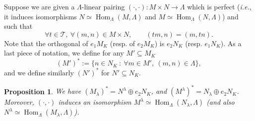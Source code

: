 \documentclass[12pt]{amsart}
\newcommand\cT{\mathcal{T}}
\DeclareMathOperator{\Hom}{Hom}
\theoremstyle{defstyle}
\theoremstyle{thmstyle}
\newtheorem{propAppendix}{Proposition}
\begin{document}
Suppose we are given a $\Lambda$-linear pairing $(\cdot,\cdot) \colon M\times N \to \Lambda$ which is perfect (\textit{i.e.}, it induces  isomorphisms $N \simeq \Hom_\Lambda(M,\Lambda)$ and $M \simeq \Hom_\Lambda(N,\Lambda)$) and such that 
\begin{equation}\label{eq:appendix_condition_T_equivariance_pairing}
	\forall t \in \cT,\ \forall (m,n)\in M\times N, \qquad (tm,n)=(m,tn).
\end{equation}
Note that the orthogonal of $e_1M_K$ (resp. of $e_2M_K$) is $e_2N_K$ (resp. $e_1N_K$). As a last piece of notation, we define for any $M'\subseteq M_K$ 
\[(M')^*:=\{n\in N_K \ \colon\ \forall m\in M',\  (m,n)\in\Lambda \},\]
and we define similarly $(N')^*$ for $N'\subseteq N_K$.

\begin{propAppendix}\label{prop:appendix_orthogonality}
	We have $(M_\lambda)^*=N^\lambda \oplus e_2 N_K$, and $(M^\lambda)^*=N_\lambda \oplus e_2 N_K$. Moreover, $(\cdot,\cdot)$ induces an isomorphism $M^\lambda\simeq \Hom_\Lambda(N_\lambda,\Lambda)$ (and also $N^\lambda\simeq \Hom_\Lambda(M_\lambda,\Lambda)$).
\end{propAppendix}
\end{document}
